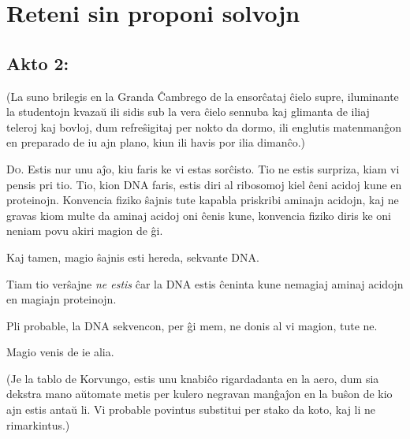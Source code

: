 \chapter{Reteni sin proponi solvojn}

\section{Akto 2:\protect\footnotemark}


(La suno brilegis en la Granda Ĉambrego de la ensorĉataj ĉielo supre,
iluminante la studentojn kvazaŭ ili sidis sub la vera ĉielo sennuba
kaj glimanta de iliaj teleroj kaj bovloj, dum refreŝigitaj per nokto
da dormo, ili englutis matenmanĝon en preparado de iu ajn plano,
kiun ili havis por ilia dimanĉo.)

\lettrine{D}o. Estis nur unu aĵo, kiu faris ke vi estas
sorĉisto. Tio ne estis surpriza, kiam vi pensis pri tio. Tio, kion DNA
faris, estis diri al ribosomoj kiel ĉeni acidoj kune en
proteinojn. Konvencia fiziko ŝajnis tute kapabla priskribi aminajn
acidojn, kaj ne gravas kiom multe da aminaj acidoj oni ĉenis kune,
konvencia fiziko diris ke oni neniam povu akiri magion de ĝi.

Kaj tamen, magio ŝajnis esti hereda, sekvante DNA. 

Tiam tio verŝajne \emph{ne estis} ĉar la DNA estis ĉeninta kune
nemagiaj aminaj acidojn en magiajn proteinojn.

Pli probable, la DNA sekvencon, per ĝi mem, ne donis al vi magion,
tute ne.

Magio venis de ie alia.

(Je la tablo de Korvungo, estis unu knabiĉo rigardadanta en la aero,
dum sia dekstra mano aŭtomate metis per kulero negravan manĝaĵon en la
buŝon de kio ajn estis antaŭ li. Vi probable povintus substitui per
stako da koto, kaj li ne rimarkintus.)

